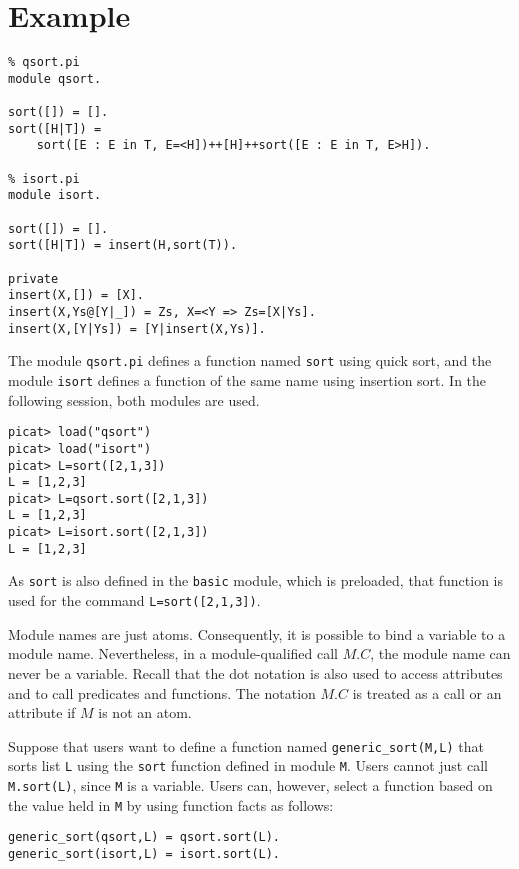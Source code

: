 \section*{Example}
\begin{verbatim}
% qsort.pi
module qsort.

sort([]) = [].
sort([H|T]) = 
    sort([E : E in T, E=<H])++[H]++sort([E : E in T, E>H]).

% isort.pi
module isort.

sort([]) = [].
sort([H|T]) = insert(H,sort(T)).

private
insert(X,[]) = [X].
insert(X,Ys@[Y|_]) = Zs, X=<Y => Zs=[X|Ys].
insert(X,[Y|Ys]) = [Y|insert(X,Ys)].
\end{verbatim}
The module \texttt{qsort.pi} defines a function named \texttt{sort} using quick sort, and the module \texttt{isort} defines a function of the same name using insertion sort. In the following session, both modules are used.
\begin{verbatim}
picat> load("qsort")
picat> load("isort")
picat> L=sort([2,1,3])
L = [1,2,3]
picat> L=qsort.sort([2,1,3])
L = [1,2,3]
picat> L=isort.sort([2,1,3])
L = [1,2,3]
\end{verbatim}
As \texttt{sort} is also defined in the \texttt{basic} module, which is preloaded, that function is used for the command \texttt{L=sort([2,1,3])}.

Module names are just atoms. Consequently, it is possible to bind a variable to a module name. Nevertheless, in a module-qualified call $M.C$, the module name can never be a variable. Recall that the dot notation is also used to access attributes and to call predicates and functions. The notation $M.C$ is treated as a call or an attribute if $M$ is not an atom.

Suppose that users want to define a function named \texttt{generic\_sort(M,L)} that sorts list \texttt{L} using the \texttt{sort} function defined in module \texttt{M}. Users cannot just call \texttt{M.sort(L)}, since \texttt{M} is a variable. Users can, however, select a function based on the value held in \texttt{M} by using function facts as follows:
\begin{verbatim}
generic_sort(qsort,L) = qsort.sort(L).
generic_sort(isort,L) = isort.sort(L).
\end{verbatim}

